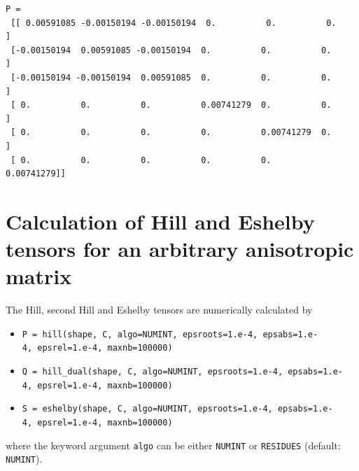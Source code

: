 \documentclass[
  a4paper,
  numbers=noendperiod,
  DIV=12]{scrreprt}
\providecommand{\tightlist}{%
  \setlength{\itemsep}{0pt}\setlength{\parskip}{0pt}}
\begin{document}
\begin{tcolorbox}
\begin{verbatim}
P =
 [[ 0.00591085 -0.00150194 -0.00150194  0.          0.          0.        ]
 [-0.00150194  0.00591085 -0.00150194  0.          0.          0.        ]
 [-0.00150194 -0.00150194  0.00591085  0.          0.          0.        ]
 [ 0.          0.          0.          0.00741279  0.          0.        ]
 [ 0.          0.          0.          0.          0.00741279  0.        ]
 [ 0.          0.          0.          0.          0.          0.00741279]]
\end{verbatim}

\end{tcolorbox}

\section{Calculation of Hill and Eshelby tensors for an arbitrary
anisotropic
matrix}\label{calculation-of-hill-and-eshelby-tensors-for-an-arbitrary-anisotropic-matrix}

The Hill, second Hill and Eshelby tensors are numerically calculated by

\begin{itemize}
\tightlist
\item
  \texttt{P\ =\ hill(shape,\ C,\ algo=NUMINT,\ epsroots=1.e-4,\ epsabs=1.e-4,\ epsrel=1.e-4,\ maxnb=100000)}
\item
  \texttt{Q\ =\ hill\_dual(shape,\ C,\ algo=NUMINT,\ epsroots=1.e-4,\ epsabs=1.e-4,\ epsrel=1.e-4,\ maxnb=100000)}
\item
  \texttt{S\ =\ eshelby(shape,\ C,\ algo=NUMINT,\ epsroots=1.e-4,\ epsabs=1.e-4,\ epsrel=1.e-4,\ maxnb=100000)}
\end{itemize}

where the keyword argument \texttt{algo} can be either \texttt{NUMINT}
or \texttt{RESIDUES} (default: \texttt{NUMINT}).
\end{document}
